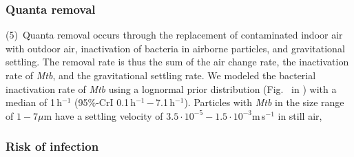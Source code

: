 \documentclass[fleqn,11pt]{wlscirep}
\begin{document}
\subsubsection*{Quanta removal}

(5)~Quanta removal occurs through the replacement of contaminated indoor air with outdoor air, inactivation of bacteria in airborne particles, and gravitational settling. The removal rate is thus the sum of the air change rate, the inactivation rate of \emph{Mtb}, and the gravitational settling rate. We modeled the bacterial inactivation rate of \emph{Mtb} using a lognormal prior distribution (Fig.~ in \supp) with a median of 1\,h$^{-1}$ (95\%-CrI 0.1\,h$^{-1}$\,$-$\,7.1\,h$^{-1}$)\cite{Loudon1969AMRRD,Lever2000LettersAppliedMicrobio,Gannon2007ResVetSci,Klein2014IJMyco}.  Particles with \emph{Mtb} in the size range of $1-7\mu$m\cite{Fennelly2020Lancet} have a settling velocity of  $3.5\cdot 10^{-5}-1.5\cdot 10^{-3}$m\,s$^{-1}$ in still air\cite{Vuorinen2020SafSci}, 

\subsubsection*{Risk of infection}
\end{document}
